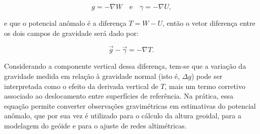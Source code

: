 \[
g = -\nabla W \quad \text{e} \quad \gamma = -\nabla U \text{,}
\]

\noindent
e que o potencial anômalo é a diferença \( T = W - U \), então o vetor diferença entre os dois campos de gravidade será dado por:

\[
\vec{g} - \vec{\gamma} = -\nabla T \text{.}
\]

\noindent
Considerando a componente vertical dessa diferença, tem-se que a variação da gravidade medida em relação à gravidade normal (isto é, \( \Delta g \)) pode ser interpretada como o efeito da derivada vertical de \( T \), mais um termo corretivo associado ao deslocamento entre superfícies de referência. Na prática, essa equação permite converter observações gravimétricas em estimativas do potencial anômalo, que por sua vez é utilizado para o cálculo da altura geoidal, para a modelagem do geóide e para o ajuste de redes altimétricas.